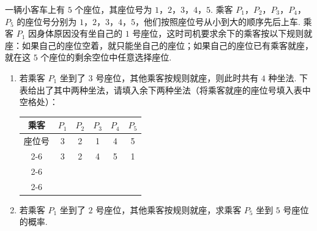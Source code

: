 \begin{problem}
一辆小客车上有 \(5\) 个座位，其座位号为 \(1\)，\(2\)，\(3\)，\(4\)，\(5\). 乘客 \(P_1\)，\(P_2\)，\(P_3\)，\(P_4\)，\(P_5\) 的座位号分别为 \(1\)，\(2\)，\(3\)，\(4\)，\(5\)，他们按照座位号从小到大的顺序先后上车. 乘客 \(P_1\) 因身体原因没有坐自己的 \(1\) 号座位，这时司机要求余下的乘客按以下规则就座：如果自己的座位空着，就只能坐自己的座位；如果自己的座位已有乘客就座，就在这 \(5\) 个座位的剩余空位中任意选择座位.

\begin{enumerate}
\item 若乘客 \(P_1\) 坐到了 \(3\) 号座位，其他乘客按规则就座，则此时共有 \(4\) 种坐法. 下表给出了其中两种坐法，请填入余下两种坐法（将乘客就座的座位号填入表中空格处）：

\begin{center}
\begin{tabular}{|c|c|c|c|c|c|}
\hline
乘客 & \(P_1\) & \(P_2\) & \(P_3\) & \(P_4\) & \(P_5\) \\
\hline
座位号 & 3 & 2 & 1 & 4 & 5 \\
\cline{2-6}
 & 3 & 2 & 4 & 5 & 1 \\
\cline{2-6}
 &  &  &  &  &  \\
\cline{2-6}
 &  &  &  &  &  \\
\hline
\end{tabular}
\end{center}

\item 若乘客 \(P_1\) 坐到了 \(2\) 号座位，其他乘客按规则就座，求乘客 \(P_5\) 坐到 \(5\) 号座位的概率.
\end{enumerate}
\end{problem}

